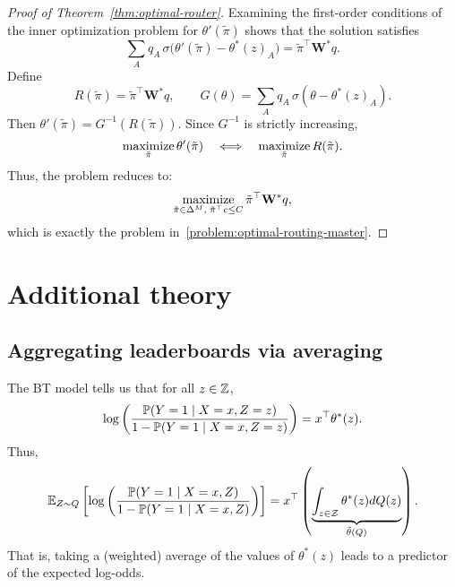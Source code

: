 \begin{proof}[Proof of Theorem~\ref{thm:optimal-router}]
    Examining the first-order conditions of the inner optimization problem for $\theta'(\tilde\pi)$ shows that the solution satisfies
    \begin{equation}
        \label{eq:router-first-order-condition}
    \sum_A q_A\,\sigma\bigl(\theta'(\tilde\pi)-\theta^*(z)_A\bigr)
    = \tilde\pi^\top \mathbf{W}^*q.
    \end{equation}
    Define
    \begin{equation}
    R(\tilde\pi) = \tilde\pi^\top \mathbf{W}^*q, \qquad G(\theta) = \sum_A q_A\,\sigma(\theta - \theta^*(z)_A).
    \end{equation}
    Then $\theta'(\tilde\pi) = G^{-1}(R(\tilde\pi))$.
    Since $G^{-1}$ is strictly increasing,
    \begin{equation}
    \maximize_{\tilde\pi} \theta'(\tilde\pi) \quad \Longleftrightarrow \quad \maximize_{\tilde\pi} R(\tilde\pi).
    \end{equation}
    Thus, the problem reduces to:
    \begin{equation}
    \maximize_{\tilde\pi \in \Delta^M, \; \tilde\pi^\top c \le C} \tilde\pi^\top \mathbf{W}^*q,
    \end{equation}
    which is exactly the problem in~\eqref{problem:optimal-routing-master}.
\end{proof}


\section{Additional theory}
\label{app:theory}

\subsection{Aggregating leaderboards via averaging}
\label{app:aggregating-averaging}

The BT model tells us that for all $z \in \Z$,
\begin{equation}
    \log\left(\frac{\P(Y=1 \mid X=x, Z=z)}{1-\P(Y=1 \mid X=x, Z=z)}\right) = x^\top \theta^*(z).
\end{equation}
Thus,
\begin{equation}
    \E_{Z \sim Q}\left[\log\left(\frac{\P(Y=1 \mid X=x, Z)}{1-\P(Y=1 \mid X=x, Z)}\right)\right] = x^{\top}\left(\underbrace{\int_{z \in \cZ} \theta^*(z) dQ(z) }_{\tilde\theta(Q)}\right).
\end{equation}
That is, taking a (weighted) average of the values of $\theta^*(z)$ leads to a predictor of the expected log-odds.

